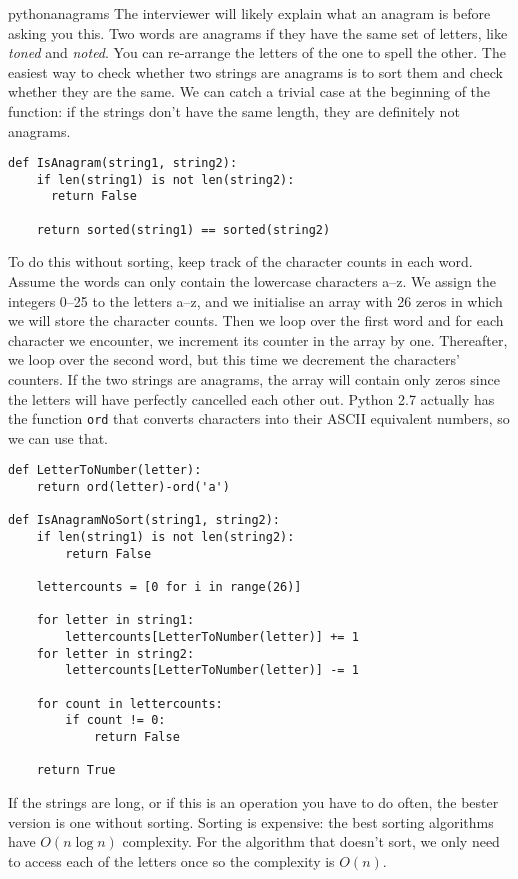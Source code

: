 \begin{answer}{pythonanagrams}
The interviewer will likely explain what an anagram is before asking you this.
Two words are anagrams if they have the same set of letters, like \emph{toned} and \emph{noted}.
You can re-arrange the letters of the one to spell the other.
The easiest way to check whether two strings are anagrams is to sort them and check whether they are the same.
We can catch a trivial case at the beginning of the function: if the strings don't have the same length, they are definitely not anagrams.
\begin{verbatim}
def IsAnagram(string1, string2):
    if len(string1) is not len(string2):
      return False

    return sorted(string1) == sorted(string2)
\end{verbatim}
%
To do this without sorting, keep track of the character counts in each word.
Assume the words can only contain the lowercase characters a--z. 
We assign
the integers 0--25
to
the letters a--z, and we initialise an array with 26 zeros in which we will store the character counts.
Then we loop over the first word and for each character we encounter, we increment its counter in the array by one.
Thereafter, we loop over the second word, but this time we decrement the characters' counters.
If the two strings are anagrams, the array will contain only zeros since the letters will have perfectly cancelled each other out.
Python 2.7 actually has the function \verb+ord+ that converts characters into their ASCII equivalent numbers, so we can use that.
\begin{verbatim}
def LetterToNumber(letter):
    return ord(letter)-ord('a')

def IsAnagramNoSort(string1, string2):
    if len(string1) is not len(string2):
        return False

    lettercounts = [0 for i in range(26)]

    for letter in string1:
        lettercounts[LetterToNumber(letter)] += 1
    for letter in string2:
        lettercounts[LetterToNumber(letter)] -= 1

    for count in lettercounts:
        if count != 0:
            return False

    return True
\end{verbatim}

If the strings are long, or if this is an operation you have to do often, the bester version is one without sorting.
Sorting is expensive: the best sorting algorithms have $O(n\log{n})$ complexity.
For the algorithm that doesn't sort, we only need to access each of the letters once so the complexity is $O(n)$.
\end{answer}
